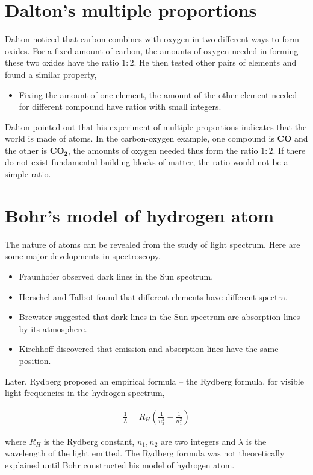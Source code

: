 \documentclass[12pt]{book} %
\numberwithin{equation}{chapter}
\def\l{\lambda}
\begin{document}
\section{Dalton's multiple proportions}
Dalton noticed that carbon combines with oxygen in two different ways to form oxides. For a fixed amount of carbon, the amounts of oxygen needed in forming these two oxides have the ratio $1:2$. He then tested other pairs of elements and found a similar property,
\begin{itembox}
\begin{itemize}
\item Fixing the amount of one element, the amount of the other element needed for different compound have ratios with small integers.
\end{itemize}
\end{itembox}
Dalton pointed out that his experiment of multiple proportions indicates that the world is made of atoms. In the carbon-oxygen example, one compound is $\mathbf{CO}$ and the other is $\mathbf{CO_{2}}$, the amounts of oxygen needed thus form the ratio $1:2$. If there do not exist fundamental building blocks of matter, the ratio would not be a simple ratio.

\section{Bohr's model of hydrogen atom}
The nature of atoms can be revealed from the study of light spectrum. Here are some major developments in spectroscopy.
\begin{itembox}
\begin{itemize}
\item Fraunhofer observed dark lines in the Sun spectrum.
\item Herschel and Talbot found that different elements have different spectra.
\item Brewster suggested that dark lines in the Sun spectrum are absorption lines by its atmosphere.
\item Kirchhoff discovered that emission and absorption lines have the same position.
\end{itemize}
\end{itembox}
Later, Rydberg proposed an empirical formula -- the Rydberg formula, for visible light frequencies in the hydrogen spectrum,
\begin{eqnbox}
\begin{align}
\frac{1}{\l}=R_{H}\left(\frac{1}{n_{2}^{2}}-\frac{1}{n_{1}^{2}}\right)
\end{align}
\end{eqnbox}
where $R_{H}$ is the Rydberg constant, $n_{1}, n_{2}$ are two integers and $\l$ is the wavelength of the light emitted. The Rydberg formula was not theoretically explained until Bohr constructed his model of hydrogen atom.
\end{document}
